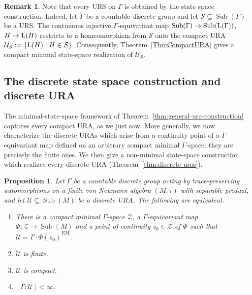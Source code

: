 \documentclass[12pt]{amsart} %
\theoremstyle{plain}
\newtheorem{proposition}[theorem]{Proposition}
\theoremstyle{definition}
\newtheorem{remark}[theorem]{Remark}
\newcommand{\LL}{{\rm L}}
\DeclareMathOperator{\Sub}{Sub}
\begin{document}
\begin{remark}\label{rmk:urs-compact-state-space-realization}
Note that every URS on $\Gamma$ is obtained by the state space construction. Indeed, let $\Gamma$ be a countable discrete group and let
$\mathcal S\subseteq\Sub(\Gamma)$ be a URS. The continuous injective
$\Gamma$-equivariant map $\Sub(\Gamma)\to\Sub(\LL(\Gamma))$, $H\mapsto\LL(H)$
restricts to a homeomorphism from $\mathcal S$ onto the compact URA
$\mathcal U_{\mathcal S}:=\{\LL(H):H\in\mathcal S\}$. Consequently, Theorem~\ref{ThmCompactURA} gives a compact
minimal state-space realization of $\mathcal U_{\mathcal S}$.
\end{remark}
\subsection{The discrete state space construction and discrete URA}
\label{subsec:discreteURAs}
The minimal-state-space framework of
Theorem~\ref{thm:general-ura-construction} captures every compact URA, as we
just saw. More generally, we now characterize the discrete URAs which arise
from a continuity point of a $\Gamma$-equivariant map defined on an arbitrary
compact minimal $\Gamma$-space: they are precisely the finite ones. We then
give a non-minimal state-space construction which realizes every discrete URA
(Theorem~\ref{thm:discrete-uras}).
\begin{proposition}\label{prop:discrete-minimal-state-space-characterization}
Let $\Gamma$ be a countable discrete group acting by trace-preserving
automorphisms on a finite von Neumann algebra $(M,\tau)$ with separable
predual, and let $\mathcal U\subseteq\Sub(M)$ be a discrete URA. The
following are equivalent.
\begin{enumerate}
\item There is a compact minimal $\Gamma$-space $\mathcal Z$, a
$\Gamma$-equivariant map $\Phi:\mathcal Z\to\Sub(M)$ and a point of continuity $z_0\in\mathcal{Z}$ of $\Phi$ such that $\mathcal U=\overline{\Gamma\cdot\Phi(z_0)}^{\,\mathrm{EM}}$.
\item $\mathcal U$ is finite.
\item $\mathcal U$ is compact.
\item $[\Gamma:\mathcal U]<\infty$.
\end{enumerate}
\end{proposition}
\end{document}
